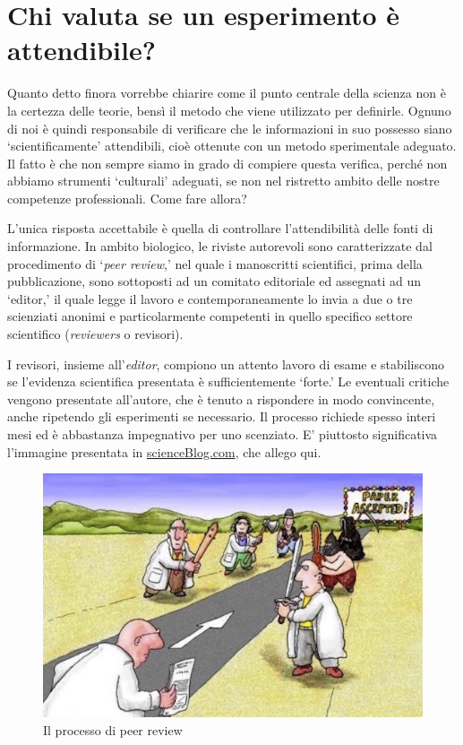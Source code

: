 \documentclass[a4paper,12pt,oneside]{book}
\begin{document}
\hypertarget{chi-valuta-se-un-esperimento-uxe8-attendibile}{%
\section{Chi valuta se un esperimento è attendibile?}\label{chi-valuta-se-un-esperimento-uxe8-attendibile}}

Quanto detto finora vorrebbe chiarire come il punto centrale della scienza non è la certezza delle teorie, bensì il metodo che viene utilizzato per definirle. Ognuno di noi è quindi responsabile di verificare che le informazioni in suo possesso siano `scientificamente' attendibili, cioè ottenute con un metodo sperimentale adeguato. Il fatto è che non sempre siamo in grado di compiere questa verifica, perché non abbiamo strumenti `culturali' adeguati, se non nel ristretto ambito delle nostre competenze professionali. Come fare allora?

L'unica risposta accettabile è quella di controllare l'attendibilità delle fonti di informazione. In ambito biologico, le riviste autorevoli sono caratterizzate dal procedimento di `\emph{peer review},' nel quale i manoscritti scientifici, prima della pubblicazione, sono sottoposti ad un comitato editoriale ed assegnati ad un `editor,' il quale legge il lavoro e contemporaneamente lo invia a due o tre scienziati anonimi e particolarmente competenti in quello specifico settore scientifico (\emph{reviewers} o revisori).

I revisori, insieme all'\emph{editor}, compiono un attento lavoro di esame e stabiliscono se l'evidenza scientifica presentata è sufficientemente `forte.' Le eventuali critiche vengono presentate all'autore, che è tenuto a rispondere in modo convincente, anche ripetendo gli esperimenti se necessario. Il processo richiede spesso interi mesi ed è abbastanza impegnativo per uno scenziato. E' piuttosto significativa l'immagine presentata in \href{http://scienceblogs.com/startswithabang/2013/06/07/the-4-jobs-of-a-referee-in-peer-review/}{scienceBlog.com}, che allego qui.

\begin{figure}

{\centering \includegraphics[width=0.75\linewidth]{_images/PeerReview} 

}

\caption{Il processo di peer review}\label{fig:figName3}
\end{figure}
\end{document}
